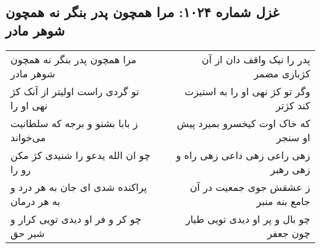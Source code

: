 \begin{center}
\section*{غزل شماره ۱۰۲۴: مرا همچون پدر بنگر نه همچون شوهر مادر}
\label{sec:1024}
\begin{longtable}{l p{0.5cm} r}
مرا همچون پدر بنگر نه همچون شوهر مادر
&&
پدر را نیک واقف دان از آن کژبازی مضمر
\\
تو گردی راست اولیتر از آنک کژ نهی او را
&&
وگر تو کژ نهی او را به استیزت کند کژتر
\\
ز بابا بشنو و برجه که سلطانیت می‌خواند
&&
که خاک اوت کیخسرو بمیرد پیش او سنجر
\\
چو ان الله یدعو را شنیدی کژ مکن رو را
&&
زهی راعی زهی داعی زهی راه و زهی رهبر
\\
پراکنده شدی ای جان به هر درد و به هر درمان
&&
ز عشقش جوی جمعیت در آن جامع بنه منبر
\\
چو کر و فر او دیدی تویی کرار و شیر حق
&&
چو بال و پر او دیدی تویی طیار چون جعفر
\\
\end{longtable}
\end{center}
